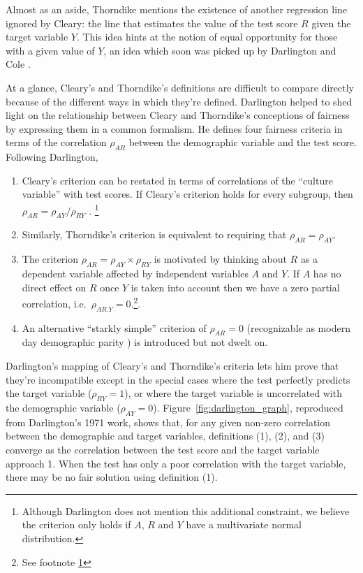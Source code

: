 \documentclass[sigconf,letterpaper,9pt]{acmart}
\begin{document}
Almost as an aside, Thorndike mentions the existence of another
regression line ignored by Cleary: the line that estimates the value of 
the test score
$R$ given the target variable $Y$. This idea hints at the notion of equal opportunity
for those with a given value of $Y$, an idea which soon was picked up by Darlington \cite{darlington1971another} and Cole \cite{cole1973bias}.

At a glance, Cleary's and Thorndike's definitions are difficult to
compare directly because of the different ways in which they're defined.
Darlington \cite{darlington1971another} helped to shed light on the relationship
between Cleary and Thorndike's conceptions of fairness by expressing them
in a common formalism. He defines four fairness criteria in terms
of the correlation $\rho_{AR}$ between the demographic variable and the
test score.  Following Darlington,

\begin{enumerate}
\item Cleary's criterion can be restated in terms of 
correlations of the ``culture variable'' with test scores.  If Cleary's criterion holds for every subgroup, then  $\rho_{AR} = \rho_{AY}/\rho_{RY}$
 \cite{vargha1996dichotomization}.
 \footnote{\label{foot:normal}Although Darlington does not mention this additional constraint, we believe the criterion only holds if $A$, $R$ and $Y$ have a 
multivariate normal distribution.}

\item Similarly, Thorndike's criterion is 
equivalent to requiring that $\rho_{AR} = \rho_{AY}$.
\item The
criterion $\rho_{AR} = \rho_{AY}\times\rho_{RY}$ is 
motivated by thinking about $R$ as a dependent variable 
affected by independent variables $A$ and $Y$. 
If $A$ has no direct effect on $R$ once $Y$ is taken
into account then we have a zero partial correlation,
i.e.\ $\rho_{AR.Y}=0$.\footnote{See footnote \ref{foot:normal}
}.
\item An alternative ``starkly simple'' criterion of $\rho_{AR} = 0$ (recognizable as modern day demographic parity \cite{DworkEtAl2012}) is introduced but not dwelt on.
\end{enumerate}


Darlington's mapping of Cleary's and Thorndike's criteria lets him
prove that they're incompatible except in the special cases where
the test perfectly predicts the target variable ($\rho_{RY}=1$), or where
the target variable is uncorrelated with the demographic variable
($\rho_{AY}=0$). Figure~\ref{fig:darlington_graph},
 reproduced from Darlington's 1971 work, shows that, for
any given non-zero correlation between the demographic and  
target variables, definitions (1), (2), and (3) converge as the correlation
between the test score and the target variable approach 1. When the
test has only a poor correlation with the target variable, there may be
no fair solution using definition (1).
\end{document}
